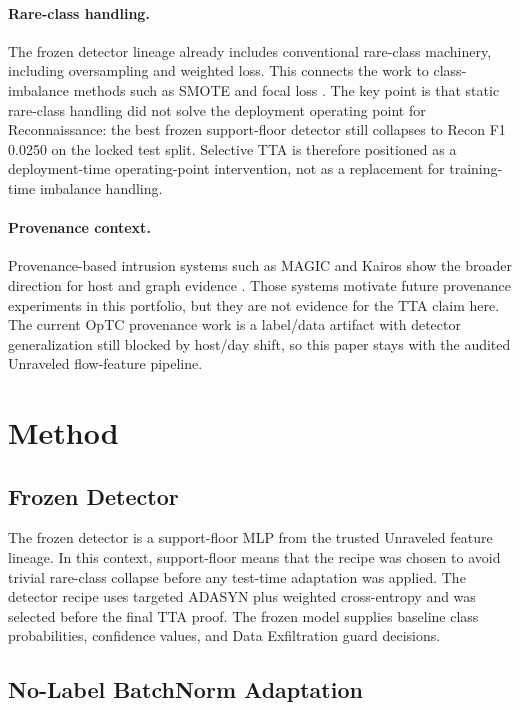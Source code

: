 \documentclass[10pt]{article}
\begin{document}
\paragraph{Rare-class handling.}
The frozen detector lineage already includes conventional rare-class machinery, including oversampling and weighted loss.
This connects the work to class-imbalance methods such as SMOTE \cite{chawla2002smote} and focal loss \cite{lin2017focal}.
The key point is that static rare-class handling did not solve the deployment operating point for Reconnaissance: the best frozen support-floor detector still collapses to Recon F1 0.0250 on the locked test split.
Selective TTA is therefore positioned as a deployment-time operating-point intervention, not as a replacement for training-time imbalance handling.

\paragraph{Provenance context.}
Provenance-based intrusion systems such as MAGIC and Kairos show the broader direction for host and graph evidence \cite{jia2024magic,cheng2024kairos}.
Those systems motivate future provenance experiments in this portfolio, but they are not evidence for the TTA claim here.
The current OpTC provenance work is a label/data artifact with detector generalization still blocked by host/day shift, so this paper stays with the audited Unraveled flow-feature pipeline.

\section{Method}

\subsection{Frozen Detector}

The frozen detector is a support-floor MLP from the trusted Unraveled feature lineage.
In this context, support-floor means that the recipe was chosen to avoid trivial rare-class collapse before any test-time adaptation was applied.
The detector recipe uses targeted ADASYN plus weighted cross-entropy and was selected before the final TTA proof.
The frozen model supplies baseline class probabilities, confidence values, and Data Exfiltration guard decisions.

\subsection{No-Label BatchNorm Adaptation}
\end{document}
